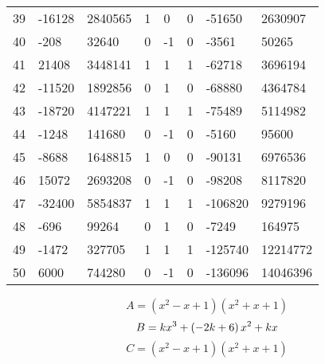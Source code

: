 \documentclass{amsart}
\begin{document}
\begin{longtable}{|l|l|l|lllll|}
39&-16128&2840565&1&0&0&-51650&2630907\\
40&-208&32640&0&-1&0&-3561&50265\\
41&21408&3448141&1&1&1&-62718&3696194\\
42&-11520&1892856&0&1&0&-68880&4364784\\
43&-18720&4147221&1&1&1&-75489&5114982\\
44&-1248&141680&0&-1&0&-5160&95600\\
45&-8688&1648815&1&0&0&-90131&6976536\\
46&15072&2693208&0&-1&0&-98208&8117820\\
47&-32400&5854837&1&1&1&-106820&9279196\\
48&-696&99264&0&1&0&-7249&164975\\
49&-1472&327705&1&1&1&-125740&12214772\\
50&6000&744280&0&-1&0&-136096&14046396\\
\hline
\end{longtable}
$$A=(x^2
 - x
 + 1)(x^2
 + x
 + 1)$$
$$B=k\*x^3
 + \left(-2\*k
 + 6\right) \*x^2
 + k\*x$$
$$C=(x^2
 - x
 + 1)(x^2
 + x
 + 1)$$
\end{document}
